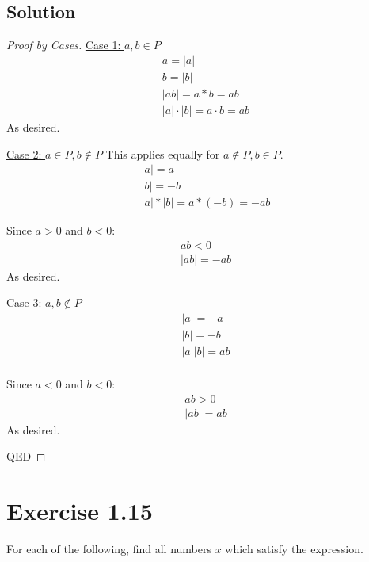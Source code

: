 \documentclass[12pt]{report}
\begin{document}
\subsection*{Solution}
\begin{proof}[Proof by Cases]
    \underline{Case 1: $a, b \in P$}
    \begin{gather}
        a = |a|\\
        b = |b|\\
        \left|ab\right| = a * b = ab\\
        \left|a\right| \cdot \left|b\right| = a \cdot b = ab
    \end{gather}
    As desired.

    \underline{Case 2: $a \in P, b \notin P$}
    This applies equally for $a \notin P, b \in P$.
    \begin{gather}
        |a| = a\\
        |b| = -b\\
        |a|*|b| = a * (-b) = -ab
    \end{gather}

    Since $a > 0$ and $b < 0$:
    \begin{gather}
        ab < 0\\
        |ab| = -ab
    \end{gather}
    As desired.

    \underline{Case 3: $a, b \notin P$}
    \begin{gather}
        |a| = -a\\
        |b| = -b\\
        |a||b| = ab\\
    \end{gather}

    Since $a < 0$ and $b < 0$:
    \begin{gather}
        ab > 0\\
        |ab| = ab
    \end{gather}
    As desired.

    QED
\end{proof}

\pagebreak
\section{Exercise 1.15}
For each of the following, find all numbers $x$ which satisfy the expression. 
\end{document}
